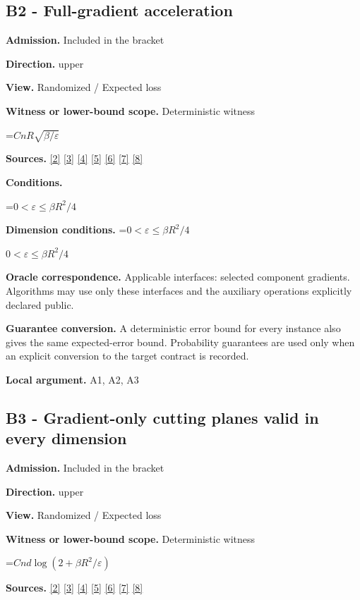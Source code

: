 \documentclass[10pt,a4paper]{article}
\newcommand{\AtlasMath}[1]{\par\begingroup\centering\setbox0=\hbox{$\displaystyle #1$}\ifdim\wd0>1.4\linewidth\typeout{ATLAS WIDE FORMULA: \the\wd0}\fi\ifdim\wd0>\linewidth\resizebox{\linewidth}{!}{\box0}\else\box0\fi\par\endgroup}
\newcommand{\AtlasInlineMath}[1]{\begingroup\setbox0=\hbox{$#1$}\ifdim\wd0>.4\linewidth\endgroup\AtlasMath{#1}\else\endgroup$#1$\fi}
\begin{document}
\subsection{B2 - Full-gradient acceleration}
\textbf{Admission.} Included in the bracket

\textbf{Direction.} upper

\textbf{View.} Randomized / Expected loss

\textbf{Witness or lower-bound scope.} Deterministic witness

\AtlasMath{CnR\sqrt{\beta/\varepsilon}}
\textbf{Sources.} \href{https://proceedings.mlr.press/v97/zhou19b/zhou19b.pdf}{[2]} \href{https://arxiv.org/pdf/1405.4980}{[3]} \href{https://arxiv.org/pdf/2101.09740v2}{[4]} \href{https://arxiv.org/pdf/2609.33360v2}{[5]} \href{https://arxiv.org/pdf/2609.10874}{[6]} \href{https://www2.isye.gatech.edu/~nemirovs/MOR_AccuracyCertificates.pdf}{[7]} \href{https://arxiv.org/pdf/2609.20701}{[8]}

\textbf{Conditions.} 
\AtlasMath{0<\varepsilon\le\beta R^2/4}


\textbf{Dimension conditions.} \AtlasInlineMath{0<\varepsilon\le\beta R^2/4}

\textbf{Oracle correspondence.} Applicable interfaces: selected component gradients. Algorithms may use only these interfaces and the auxiliary operations explicitly declared public.

\textbf{Guarantee conversion.} A deterministic error bound for every instance also gives the same expected-error bound. Probability guarantees are used only when an explicit conversion to the target contract is recorded.

\textbf{Local argument.} A1, A2, A3

\subsection{B3 - Gradient-only cutting planes valid in every dimension}
\textbf{Admission.} Included in the bracket

\textbf{Direction.} upper

\textbf{View.} Randomized / Expected loss

\textbf{Witness or lower-bound scope.} Deterministic witness

\AtlasMath{Cnd\log(2+\beta R^2/\varepsilon)}
\textbf{Sources.} \href{https://proceedings.mlr.press/v97/zhou19b/zhou19b.pdf}{[2]} \href{https://arxiv.org/pdf/1405.4980}{[3]} \href{https://arxiv.org/pdf/2101.09740v2}{[4]} \href{https://arxiv.org/pdf/2609.33360v2}{[5]} \href{https://arxiv.org/pdf/2609.10874}{[6]} \href{https://www2.isye.gatech.edu/~nemirovs/MOR_AccuracyCertificates.pdf}{[7]} \href{https://arxiv.org/pdf/2609.20701}{[8]}
\end{document}

